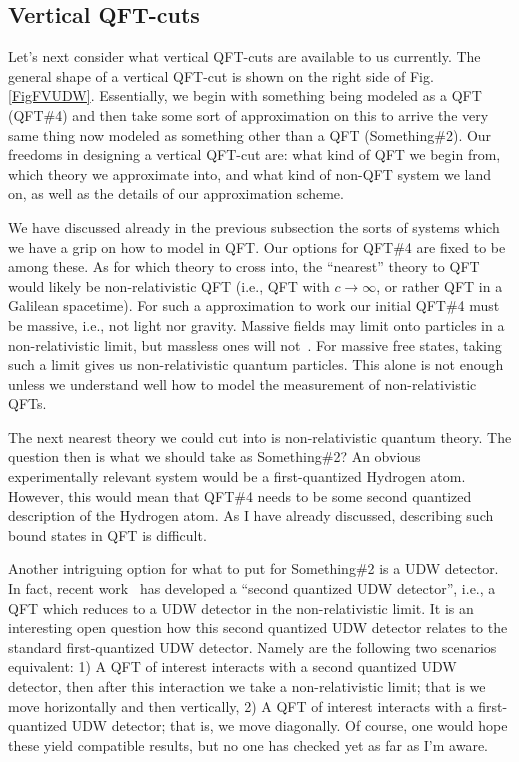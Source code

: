 \documentclass[12pt,prd,superscriptaddress,floatfix,amsmath,amssymb,amsfonts,nofootinbib]{revtex4-2}
\begin{document}
\subsection{Vertical QFT-cuts}
Let's next consider what vertical QFT-cuts are available to us currently. The general shape of a vertical QFT-cut is shown on the right side of Fig. \ref{FigFVUDW}. Essentially, we begin with something being modeled as a QFT (QFT\#4) and then take some sort of approximation on this to arrive the very same thing now modeled as something other than a QFT (Something\#2). Our freedoms in designing a vertical QFT-cut are: what kind of QFT we begin from, which theory we approximate into, and what kind of non-QFT system we land on, as well as the details of our approximation scheme.

We have discussed already in the previous subsection the sorts of systems which we have a grip on how to model in QFT. Our options for QFT\#4 are fixed to be among these. As for which theory to cross into, the ``nearest'' theory to QFT would likely be non-relativistic QFT (i.e., QFT with $c\to\infty$, or rather QFT in a Galilean spacetime). For such a approximation to work our initial QFT\#4 must be massive, i.e., not light nor gravity. Massive fields may limit onto particles in a non-relativistic limit, but massless ones will not~\cite{Lamb1995,Rosaler}. For massive free states, taking such a limit gives us non-relativistic quantum particles. This alone is not enough unless we understand well how to model the measurement of non-relativistic QFTs.

The next nearest theory we could cut into is non-relativistic quantum theory. The question then is what we should take as Something\#2? An obvious experimentally relevant system would be a first-quantized Hydrogen atom. However, this would mean that QFT\#4 needs to be some second quantized description of the Hydrogen atom. As I have already discussed, describing such bound states in QFT is difficult. %

Another intriguing option for what to put for Something\#2 is a UDW detector. In fact, recent work~\cite{FlaminiaAchim} has developed a ``second quantized UDW detector'', i.e., a QFT which reduces to a UDW detector in the non-relativistic limit. It is an interesting open question how this second quantized UDW detector relates to the standard first-quantized UDW detector. Namely are the following two scenarios equivalent: 1) A QFT of interest interacts with a second quantized UDW detector, then after this interaction we take a non-relativistic limit; that is we move horizontally and then vertically, 2) A QFT of interest interacts with a first-quantized UDW detector; that is, we move diagonally. Of course, one would hope these yield compatible results, but no one has checked yet as far as I'm aware.
\end{document}

